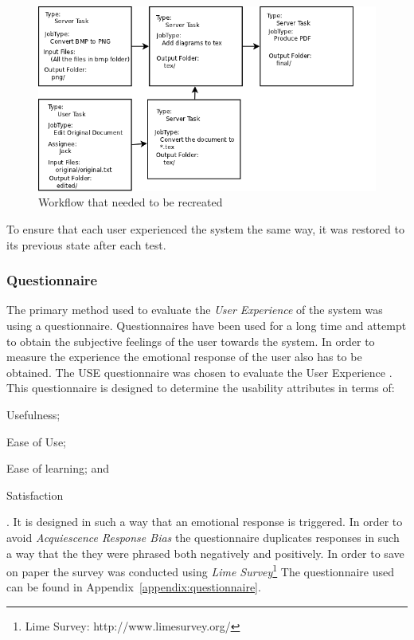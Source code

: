 \documentclass[12pt,a4paper]{report}
\begin{document}
\begin{figure}[!h]
    \begin{center}
        \includegraphics[scale=0.45]{figures/workflow.png}
    \end{center}
    \caption{Workflow that needed to be recreated}
    \label{eval:workflow}
\end{figure}
To ensure that each user experienced the system the same way, it was restored to
its previous state after each test. 

\subsubsection{Questionnaire}
The primary method used to evaluate the \emph{User Experience} of the system was
using a questionnaire. Questionnaires have been used for a long time and attempt
to obtain the subjective feelings of the user towards the
system\cite{Chin:1988:DIM:57167.57203}. In order to measure the experience the
emotional response of the user also has to be obtained. The USE questionnaire
was chosen to evaluate the User Experience \cite{lund2001measuring}. This
questionnaire is designed to determine the usability attributes in terms of:
\begin{inparaenum}[(i)]\item Usefulness;\item Ease of Use; \item Ease of learning; and \item
Satisfaction \end{inparaenum}. It is designed in such a way that an
emotional response is triggered. In order to avoid \emph{Acquiescence Response Bias}
the questionnaire duplicates responses in such a way that the they were
phrased both negatively and positively. 
In order to save on paper the survey was conducted using \emph{Lime
Survey}\footnote{Lime Survey: http://www.limesurvey.org/}
The questionnaire used can be found in Appendix~\ref{appendix:questionnaire}.
\end{document}
